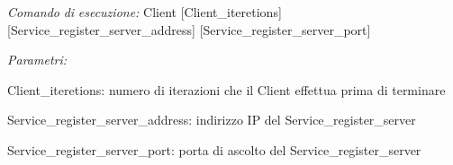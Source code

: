  {\itshape Comando} {\itshape di} {\itshape esecuzione\-:} Client \mbox{[}Client\-\_\-iteretions\mbox{]} \mbox{[}Service\-\_\-register\-\_\-server\-\_\-address\mbox{]} \mbox{[}Service\-\_\-register\-\_\-server\-\_\-port\mbox{]} \par
 {\itshape Parametri\-:} 
\begin{DoxyItemize}
\item Client\-\_\-iteretions\-: numero di iterazioni che il Client effettua prima di terminare
\item Service\-\_\-register\-\_\-server\-\_\-address\-: indirizzo I\-P del Service\-\_\-register\-\_\-server
\item Service\-\_\-register\-\_\-server\-\_\-port\-: porta di ascolto del Service\-\_\-register\-\_\-server 
\end{DoxyItemize}